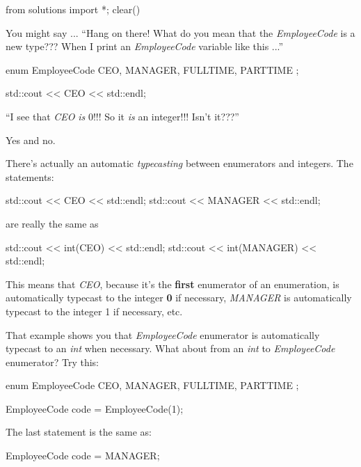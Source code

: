 \begin{python0}
from solutions import *; clear()
\end{python0}

You might say ... ``Hang on there! What do you mean that the
\textit{EmployeeCode} is a new type??? When I print an \textit{EmployeeCode}
variable like this ...''

\begin{consolethree}[escapeinside=||]
enum EmployeeCode
{
    CEO, MANAGER, FULLTIME, PARTTIME
};

std::cout << CEO << std::endl;
\end{consolethree}

``I see that \textit{CEO} \textit{is} 0!!! So it \textit{is} an integer!!!
Isn't it???''

Yes and no.

There's actually an automatic \textit{typecasting} between
enumerators and integers. The statements:

\begin{consolethree}[escapeinside=||]
std::cout << CEO << std::endl;
std::cout << MANAGER << std::endl;
\end{consolethree}

are really the same as

\begin{consolethree}[escapeinside=||]
std::cout << int(CEO) << std::endl;
std::cout << int(MANAGER) << std::endl;
\end{consolethree}

This means that \textit{CEO}, because it's the
\textbf{first} enumerator of an enumeration, is automatically
typecast to the integer \textbf{0} if necessary, \textit{MANAGER}
is automatically typecast to the integer 1 if necessary, etc.

That example shows you that \textit{EmployeeCode} enumerator is
automatically typecast to an \textit{int} when necessary. What about from
an \textit{int} to \textit{EmployeeCode} enumerator? Try this:

\begin{consolethree}[escapeinside=||]
enum EmployeeCode
{
    CEO, MANAGER, FULLTIME, PARTTIME
};

EmployeeCode code = EmployeeCode(1);
\end{consolethree}

The last statement is the same as:

\begin{consolethree}[escapeinside=||]
EmployeeCode code = MANAGER;
\end{consolethree}

